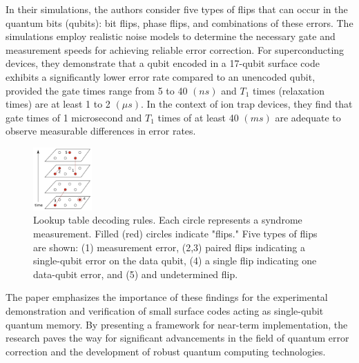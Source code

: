 In their simulations, the authors consider five types of flips that can occur in the quantum bits (qubits): bit flips, phase flips, and combinations of these errors. The simulations employ realistic noise models to determine the necessary gate and measurement speeds for achieving reliable error correction. For superconducting devices, they demonstrate that a qubit encoded in a 17-qubit surface code exhibits a significantly lower error rate compared to an unencoded qubit, provided the gate times range from 5 to 40 $(ns)$ and $T_1$ times (relaxation times) are at least 1 to 2 $(\mu s)$. In the context of ion trap devices, they find that gate times of 1 microsecond and $T_1$ times of at least 40 $(ms)$ are adequate to observe measurable differences in error rates.

\begin{figure}[h]
    \centering
    \includegraphics[width=0.2\textwidth]{sections/5_practical_implementation/LUT_rule.jpg}
    \caption{Lookup table decoding rules. Each circle represents a syndrome measurement. Filled (red) circles indicate "flips." Five types of flips are shown: (1) measurement error, (2,3) paired flips indicating a single-qubit error on the data qubit, (4) a single flip indicating one data-qubit error, and (5) and undetermined flip.}
    \label{fig:LUT_rule}
\end{figure}

The paper emphasizes the importance of these findings for the experimental demonstration and verification of small surface codes acting as single-qubit quantum memory. By presenting a framework for near-term implementation, the research paves the way for significant advancements in the field of quantum error correction and the development of robust quantum computing technologies.
